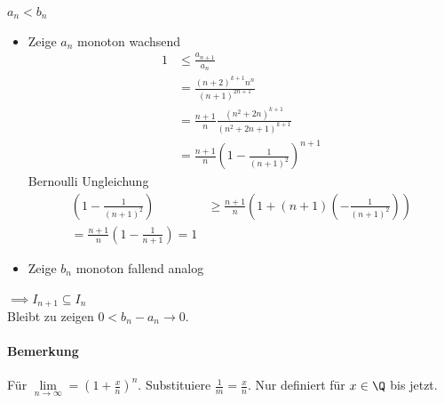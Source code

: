 \prove $a_n<b_n$
\begin{itemize}
	\item Zeige $a_n$ monoton wachsend
	\begin{align*}
		1&\leq \frac{a_{n+1}}{a_n}\\
		&=\frac{(n+2)^{k+1}n^n}{(n+1)^{2n+1}}\\
		&=\frac{n+1}{n}\frac{(n^2+2n)^{k+1}}{(n^2+2n+1)^{k+1}}\\
		&=\frac{n+1}{n}\left(1-\frac{1}{(n+1)^2}\right)^{n+1}
	\end{align*}
	Bernoulli Ungleichung
	\begin{align*}
		\left(1-\frac{1}{(n+1)^2}\right)&\geq \frac{n+1}{n}\left(1+(n+1)\left(-\frac{1}{(n+1)^2}\right)\right)\\
		=\frac{n+1}{n}(1-\frac{1}{n+1})=1
	\end{align*}
	\item Zeige $b_n$ monoton fallend analog
\end{itemize}
$\implies I_{n+1}\subseteq I_n$\\
Bleibt zu zeigen $0<b_n-a_n\to 0$. 
\paragraph{Bemerkung} Für $\lim\limits_{n\to\infty}=\left(1+\frac{x}{n}\right)^n$. Substituiere $\frac{1}{m}=\frac{x}{n}$. Nur definiert für $x\in\Q$ bis jetzt.
